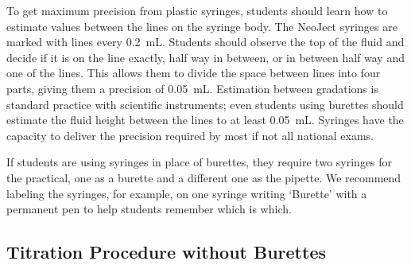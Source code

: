 To get maximum precision from plastic syringes, students should learn how to estimate values between the lines on the syringe body. The NeoJect syringes are marked with lines every 0.2~mL. Students should observe the top of the fluid and decide if it is on the line exactly, half way in between, or in between half way and one of the lines. This allows them to divide the space between lines into four parts, giving them a precision of 0.05~mL. Estimation between gradations is standard practice with scientific instruments; even students using burettes should estimate the fluid height between the lines to at least 0.05~mL. Syringes have the capacity to deliver the precision required by most if not all national exams.

If students are using syringes in place of burettes, they require two syringes for the practical, one as a burette and a different one as the pipette. We recommend labeling the syringes, for example, on one syringe writing ‘Burette’ with a permanent pen to help students remember which is which.

\subsection{Titration Procedure without Burettes}

